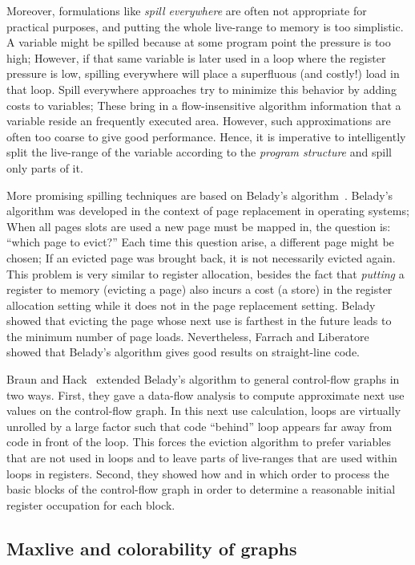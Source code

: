 {Moreover, formulations like \emph{spill everywhere} are often not appropriate for practical purposes,
and putting the whole live-range to memory is too simplistic.
A variable might be spilled because at some program point the pressure is too high;
However, if that same variable is later used in a loop where the register pressure is low,
spilling everywhere will place a superfluous (and costly!) load in that loop.
Spill everywhere approaches try to minimize this behavior by adding costs to variables;
These bring in a flow-insensitive algorithm information that a variable reside an frequently executed area.
However, such approximations are often too coarse to give good performance.
Hence, it is imperative to intelligently split the live-range of the variable according to the \emph{program structure} and spill only parts of it.

More promising spilling techniques are based on Belady's algorithm~\cite{belady:1966:storage}.
Belady's algorithm was developed in the context of page replacement in operating systems;
When all pages slots are used a new page must be mapped in, the question is: ``which page to evict?''
Each time this question arise, a different page might be chosen;
If an evicted page was brought back, it is not necessarily evicted again.
This problem is very similar to register allocation, besides the fact that \emph{putting} a register to memory (evicting a page) also incurs a cost (a store) in the register allocation setting while it does not in the page replacement setting.
Belady showed that evicting the page whose next use is farthest in the future leads to the minimum number of page loads. 
Nevertheless, Farrach and Liberatore~\cite{farach:98:local} showed that Belady's algorithm gives good results on straight-line code.

Braun and Hack~\cite{BH:2009:Spill} extended Belady's algorithm to general control-flow graphs in two ways.
First, they gave a data-flow analysis to compute approximate next use values on the control-flow graph.
In this next use calculation, loops are virtually unrolled by a large factor such that code ``behind'' loop appears far away from code in front of the loop.
This forces the eviction algorithm to prefer variables that are not used in loops and to leave parts of live-ranges that are used within loops in registers.
Second, they showed how and in which order to process the basic blocks of the control-flow graph in order to determine a reasonable initial register occupation for each block.

\subsection{Maxlive and colorability of graphs}

}
